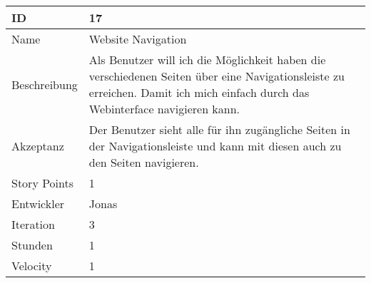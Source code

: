 \begin{table}[htbp]
\begin{minipage}{\linewidth}
\setlength{\tymax}{0.5\linewidth}
\centering
\small
\begin{tabulary}{\textwidth}{|l|p{10cm}|} \hline
ID   &17\\\hline


Name  &Website Navigation\\\hline
Beschreibung&Als Benutzer will ich die Möglichkeit haben die verschiedenen Seiten über eine Navigationsleiste zu erreichen. Damit ich mich einfach durch das Webinterface navigieren kann.\\\hline
Akzeptanz &Der Benutzer sieht alle für ihn zugängliche Seiten in der Navigationsleiste und kann mit diesen auch zu den Seiten navigieren.\\\hline
Story Points&1\\\hline
Entwickler &Jonas\\\hline
Iteration &3\\\hline
Stunden  &1\\\hline
Velocity &1\\\hline
\end{tabulary}
\end{minipage}
\end{table}



